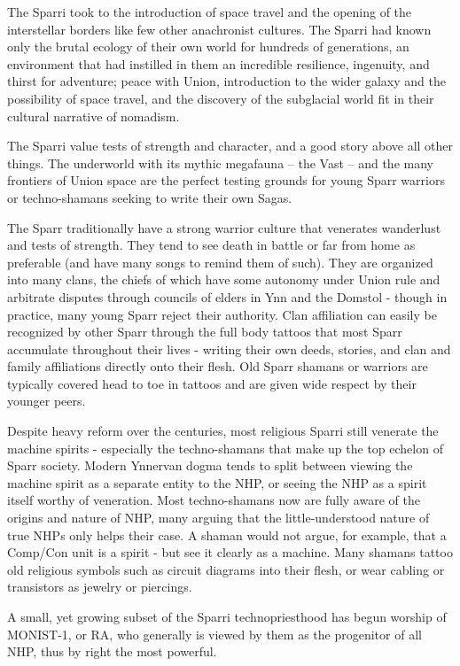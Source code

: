 The Sparri took to the introduction of space travel and the opening of the interstellar borders like
few other anachronist cultures. The Sparri had known only the brutal ecology of their own world
for hundreds of generations, an environment that had instilled in them an incredible resilience,
ingenuity, and thirst for adventure; peace with Union, introduction to the wider galaxy and the
possibility of space travel, and the discovery of the subglacial world fit in their cultural narrative of
nomadism.

The Sparri value tests of strength and character, and a good story above all other things. The
underworld with its mythic megafauna -- the Vast -- and the many frontiers of Union space are the
perfect testing grounds for young Sparr warriors or techno-shamans seeking to write their own
Sagas.

The Sparr traditionally have a strong warrior culture that venerates wanderlust and tests of
strength. They tend to see death in battle or far from home as preferable (and have many songs
to remind them of such). They are organized into many clans, the chiefs of which have some
autonomy under Union rule and arbitrate disputes through councils of elders in Ynn and the
Domstol - though in practice, many young Sparr reject their authority. Clan affiliation can easily be
recognized by other Sparr through the full body tattoos that most Sparr accumulate throughout
their lives - writing their own deeds, stories, and clan and family affiliations directly onto their flesh.
Old Sparr shamans or warriors are typically covered head to toe in tattoos and are given wide
respect by their younger peers.

Despite heavy reform over the centuries, most religious Sparri still venerate the machine spirits -
especially the techno-shamans that make up the top echelon of Sparr society. Modern Ynnervan
dogma tends to split between viewing the machine spirit as a separate entity to the NHP, or
seeing the NHP as a spirit itself worthy of veneration. Most techno-shamans now are fully aware
of the origins and nature of NHP, many arguing that the little-understood nature of true NHPs only
helps their case. A shaman would not argue, for example, that a Comp/Con unit is a spirit - but
see it clearly as a machine. Many shamans tattoo old religious symbols such as circuit diagrams
into their flesh, or wear cabling or transistors as jewelry or piercings.

A small, yet growing subset of the Sparri technopriesthood has begun worship of MONIST-1, or
RA, who generally is viewed by them as the progenitor of all NHP, thus by right the most powerful.


